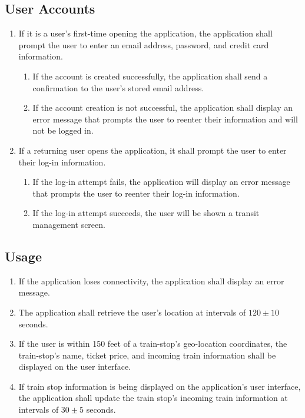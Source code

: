 \documentclass[titlepage]{article}
\begin{document}
	\subsection{User Accounts}\begin{enumerate}
		\item If it is a user’s first-time opening the application, the application shall prompt the user to enter an email address, password, and credit card information.
		\begin{enumerate}
			\item If the account is created successfully, the application shall send a confirmation to the user’s stored email address.
			\item If the account creation is not successful, the application shall display an error message that prompts the user to reenter their information and will not be logged in.
		\end{enumerate}
		\item If a returning user opens the application, it shall prompt the user to enter their log-in information.
			\begin{enumerate}
				\item If the log-in attempt fails, the application will display an error message that prompts the user to reenter their log-in information.
				\item If the log-in attempt succeeds, the user will be shown a transit management screen.
			\end{enumerate}
	\end{enumerate}
	
	\subsection{Usage}\begin{enumerate}
		\item If the application loses connectivity, the application shall display an error message. 
		\item The application shall retrieve the user’s location at intervals of $120\pm10$ seconds.
		\item If the user is within 150 feet of a train-stop’s geo-location coordinates, the train-stop’s name, ticket price, and incoming train information shall be displayed on the user interface.
		\item If train stop information is being displayed on the application’s user interface, the application shall update the train stop’s incoming train information at intervals of $30\pm 5$ seconds.
	\end{enumerate}
	
\end{document}
